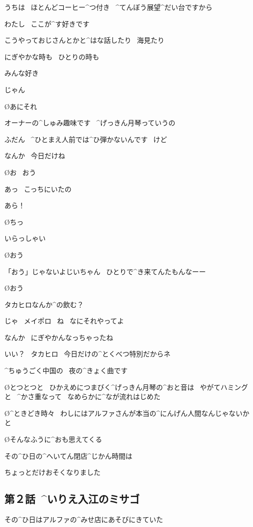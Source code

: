 \A うちは
\ ほとんどコーヒー^{つ}{付}き
\ ^{てんぼう}{展望}^{だい}{台}ですから

\A わたし
\ ここが^{す}{好}きです

\A こうやっておじさんとかと^{はな}{話}したり
\ 海見たり

\A にぎやかな時も
\ ひとりの時も

\A みんな好き

\page
\A じゃん

\O あにそれ

\A オーナーの^{しゅみ}{趣味}です
\ ^{げっきん}{月琴}っていうの

\A ふだん
\ ^{ひとまえ}{人前}では^{ひ}{弾}かないんです
\ けど

\page
\A なんか
\ 今日だけね

\O お
\ おう

\T あっ
\ こっちにいたの

\A あら！

\O ちっ

\A いらっしゃい

\O おう

\T 「おう」じゃないよじいちゃん
\ ひとりで^{き}{来}てんたもんなーー

\O おう

\A タカヒロなんか^{の}{飲}む？

\page
\T じゃ
\ メイポロ
\ ね
\ なにそれやってよ

\A なんか
\ にぎやかんなっちゃったね

\A いい？
\ タカヒロ
\ 今日だけの^{とくべつ}{特別}だからネ

\A ^{ちゅうごく}{中国}の
\ 夜の^{きょく}{曲}です

\page[39]
\O とつとつと
\ ひかえめにつまびく^{げっきん}{月琴}の^{おと}{音}は
\ やがてハミングと
\ ^{かさ}{重}なって
\ なめらかに^{なが}{流}れはじめた

\page
\O ^{ときどき}{時々}
\ わしにはアルファさんが本当の^{にんげん}{人間}なんじゃないかと

\O そんなふうに^{おも}{思}えてくる

\page[42]
\A その^{ひ}{日}の^{へいてん}{閉店}^{じかん}{時間}は

\A ちょっとだけおそくなりました


\subsection{第２話\ ^{いりえ}{入江}のミサゴ}

\page[44]
\T その^{ひ}{日}はアルファの^{みせ}{店}にあそびにきていた

